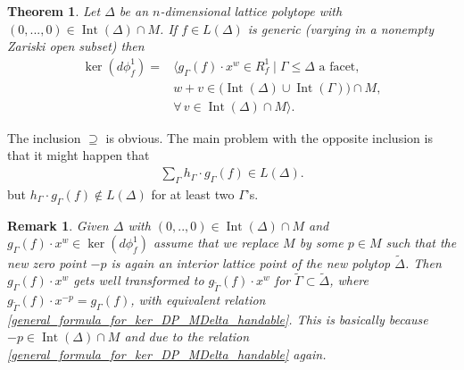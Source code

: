\documentclass[12pt, english]{article}
\newtheorem{remark}[definition]{Remark}
\newtheorem{theorem}[definition]{Theorem}
\DeclareMathOperator{\Int}{Int}
\DeclareMathOperator{\Supp}{Supp}
\DeclareMathOperator{\Convhull}{Convhull}
\begin{document}
\begin{theorem} \label{Theorem_formula_ker_ITT}
	Let $\Delta$ be an $n$-dimensional lattice polytope 
	with $(0,...,0) \in \Int(\Delta) \cap M$. If $f \in L(\Delta)$ is generic (varying in a nonempty Zariski open subset) then
	\begin{align}\label{general_formula_for_ker_DP_MDelta_handable}
		\ker(d \phi_{f}^1) =&  \Big\langle g_{\Gamma}(f) \cdot x^w \in R_f^1 \mid \Gamma \leq \Delta \textrm{ a facet}, \nonumber  \\
		& w + v \in \big( \Int(\Delta) \cup \Int(\Gamma) \big) \cap M, \\
		& \forall \, v \in \Int(\Delta) \cap M \Big\rangle. \nonumber
	\end{align}
\end{theorem}


The inclusion $\supseteq$ is obvious. The main problem with the opposite inclusion is that it might happen that 
\begin{align} \label{formula_difficulty_kernel_linear_comb_lDelta}
	\sum\limits_{\Gamma} h_{\Gamma} \cdot g_{\Gamma}(f) \in L(\Delta).
\end{align}
but $h_{\Gamma} \cdot g_{\Gamma}(f) \notin L(\Delta)$ for at least two $\Gamma$'s.

\begin{remark}
	\normalfont
	Given $\Delta$ with $(0,..,0) \in \Int(\Delta) \cap M$ and $g_{\Gamma}(f) \cdot x^w \in \ker(d \phi_f^1)$ assume that we replace $M$ by some $p \in M$ such that the new zero point $-p$ is again an interior lattice point of the new polytop $\tilde{\Delta}$. Then $g_{\Gamma}(f) \cdot x^w$ gets well transformed to $g_{\tilde{\Gamma}}(f) \cdot x^w$ for $\tilde{\Gamma} \subset \tilde{\Delta}$, where $g_{\tilde{\Gamma}}(f) \cdot x^{-p} = g_{\Gamma}(f)$, with equivalent relation \ref{general_formula_for_ker_DP_MDelta_handable}. This is basically because $-p \in \Int(\Delta) \cap M$ and due to the relation \ref{general_formula_for_ker_DP_MDelta_handable} again.	
\end{remark}
\end{document}
